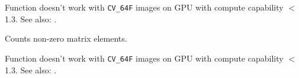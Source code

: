 Function doesn't work with \texttt{CV\_64F} images on GPU with compute capability $<$ 1.3.\newline
See also: .


Counts non-zero matrix elements.

\begin{description}
\end{description}

Function doesn't work with \texttt{CV\_64F} images on GPU with compute capability $<$ 1.3.\newline
See also: .